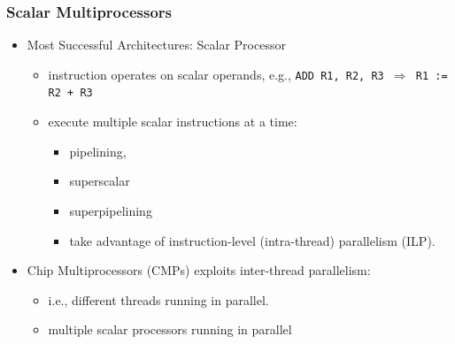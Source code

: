 \documentclass{beamer}
\begin{document}
\begin{frame}[fragile,t]
\frametitle{Scalar Multiprocessors}

\begin{itemize}
            \item Most Successful Architectures: Scalar Processor
                \begin{itemize}
                    \item instruction operates on scalar operands, 
                            e.g., {\tt ADD R1, R2, R3 $\Rightarrow$ R1 := R2 + R3}
                    \item execute multiple scalar instructions at a time:
                    \begin{itemize}
                        \item pipelining, 
                        \item superscalar
                        \item superpipelining
                        \item take advantage of instruction-level (intra-thread) 
                                parallelism (ILP).
                    \end  {itemize}
                \end  {itemize}

            \item Chip Multiprocessors (CMPs) exploits inter-thread parallelism:
                    \begin{itemize}
                        \item i.e., different threads running in parallel. 
                        \item multiple scalar processors running in parallel
                    \end  {itemize}
\end  {itemize}


\end{frame}
\end{document}
